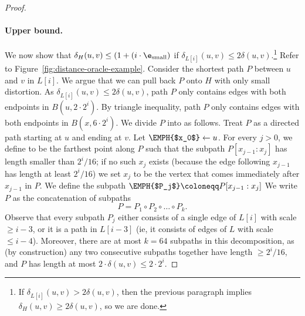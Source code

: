 \documentclass[11pt]{article}
\newcommand{\dist}{\ensuremath{\delta}}
\begin{document}
\begin{proof}
    \paragraph{Upper bound.} We now show that $\dist_H(u,v) \le (1+(i \cdot \e_{\rm small})$ if $\dist_{L[i]}(u,v) \le 2 \dist(u,v)$.\footnote{If $\dist_{L[i]}(u,v) > 2 \dist(u,v)$, then the previous paragraph implies $\dist_H(u,v) \ge 2 \dist(u,v)$, so we are
    done.
    }
    Refer to Figure~\ref{fig:distance-oracle-example}. Consider the shortest path $P$ between $u$ and $v$ in $L[i]$. We argue that we can pull back $P$ onto $H$ with only small distortion. As $\dist_{L[i]}(u,v) \le 2 \dist(u,v)$, path $P$ only contains edges with both endpoints in $B(u, 2 \cdot 2^i)$. By triangle inequality, path $P$ only contains edges with both endpoints in $B(x, 6 \cdot 2^i)$. 
We divide $P$ into  as follows. Treat $P$ as a directed path starting at $u$ and ending at $v$. Let $\EMPH{$x_0$} \gets u$. For every $j > 0$, we define  to be the farthest point along $P$ such that the subpath $P[x_{j-1}:x_j]$ has length smaller than $2^i / 16$; if no such $x_j$ exists (because the edge following $x_{j-1}$ has length at least $2^i / 16$) we set $x_j$ to be the vertex that comes immediately after $x_{j-1}$ in $P$.  We define the subpath $\EMPH{$P_j$} \coloneqq P[x_{j-1}:x_j]$
We write $P$ as the concatenation of subpaths
\[P = P_1 \circ P_2 \circ \ldots \circ P_k.\]
Observe that every subpath $P_j$ either consists of a single edge of $L[i]$ with scale $\ge i - 3$, or it is a path in $L[i-3]$ (ie, it consists of edges of $L$ with scale $\le i-4$). Moreover, there are at most $k = 64$ subpaths in this decomposition, as (by construction) any two consecutive subpaths together have length $\ge 2^i / 16$, and $P$ has length at most $2 \cdot \dist(u,v) \le 2 \cdot 2^i$.


\end{proof}
\end{document}
